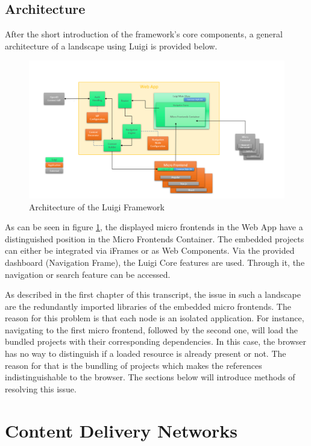 \subsection{Architecture}

After the short introduction of the framework's core components, a general architecture of a landscape using Luigi is provided below.

\begin{figure}[!h]
	\centering
	\includegraphics[width=1.05\textwidth]{Figures/Luigi_Architektur.png}
	\caption{Architecture of the Luigi Framework \cite{luigi_architecture}}
	\label{fig:luigi_architecture_fig}
\end{figure}

As can be seen in figure \ref{fig:luigi_architecture_fig}, the displayed micro frontends in the Web App have a distinguished position in the Micro Frontends Container. The embedded projects can either be integrated via iFrames or as Web Components.
Via the provided dashboard (Navigation Frame), the Luigi Core features are used. Through it, the navigation or search feature can be accessed.

As described in the first chapter of this transcript, the issue in such a landscape are the redundantly imported libraries of the embedded micro frontends. The reason for this problem is that each node is an isolated application.
For instance, navigating to the first micro frontend, followed by the second one, will load the bundled projects with their corresponding dependencies. In this case, the browser has no way to distinguish if a loaded resource is already present or not. The reason for that is the bundling of projects which makes the references indistinguishable to the browser.
The sections below will introduce methods of resolving this issue. 

\section{Content Delivery Networks}
\label{cdn_intro}

